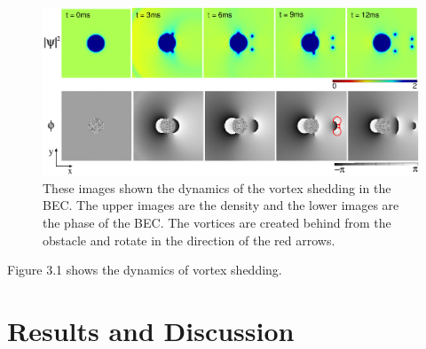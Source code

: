 \documentclass[12pt,a4paper]{report}
\begin{document}
\begin{figure}[htbp]
\begin{center}
\includegraphics[scale=0.6,keepaspectratio]{3-1.eps}
\caption{
These images shown the dynamics of the vortex shedding in the BEC.
The upper images are the density and the lower images are the phase of the BEC.
The vortices are created behind from the obstacle and rotate in the direction of the red arrows.
}
\label{FIG:3-1}
\end{center}
\end{figure}
Figure 3.1 shows the dynamics of vortex shedding.

\newpage
\section{Results and Discussion}
\end{document}

